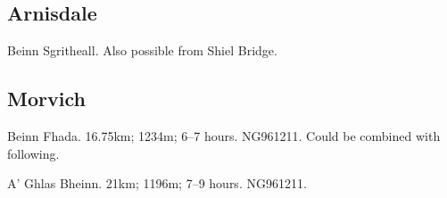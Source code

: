 
\subsection{Arnisdale}

\begin{munros}
\item
Beinn Sgritheall.  Also possible from Shiel Bridge.  \tick
\end{munros}


\subsection{Morvich}

\begin{munros}
\item
\target Beinn Fhada.  16.75km; 1234m; 6--7 hours.  NG961211.  Could be
combined with following.  \tick

\item \target A' Ghlas Bheinn.  21km; 1196m; 7--9 hours.  NG961211. \tick
\end{munros}
